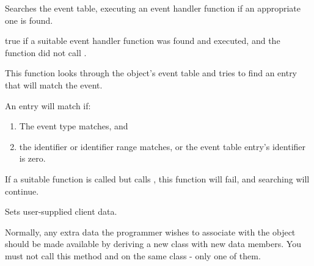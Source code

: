

\label{wxevthandlersearcheventtable}


Searches the event table, executing an event handler function if an appropriate one
is found.





true if a suitable event handler function was found and executed, and the function did not
call .


This function looks through the object's event table and tries to find an entry
that will match the event.

An entry will match if:

\begin{enumerate}\itemsep=0pt
\item The event type matches, and
\item the identifier or identifier range matches, or the event table entry's identifier is zero.
\end{enumerate}

If a suitable function is called but calls , this function will
fail, and searching will continue.



\label{wxevthandlersetclientdata}


Sets user-supplied client data.




Normally, any extra data the programmer wishes to associate with 
the object should be made available by deriving a new class
with new data members. You must not call this method and
 on the
same class - only one of them.

